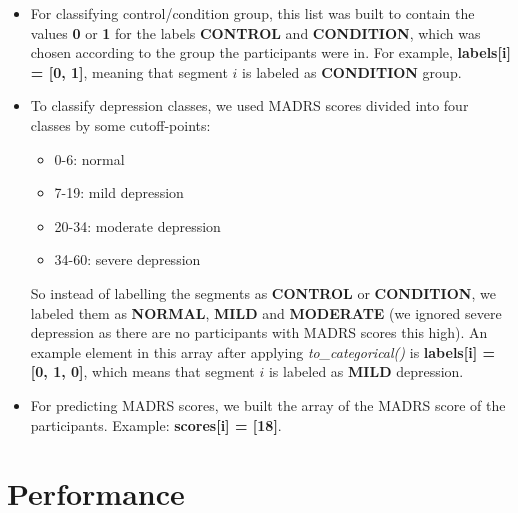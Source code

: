 \begin{itemize}
  \item For classifying control/condition group, this list was built to contain the values \textbf{0} or \textbf{1} for the labels \textbf{CONTROL} and \textbf{CONDITION}, which was chosen according to the group the participants were in. For example, \textbf{labels[i] = [0, 1]}, meaning that segment $i$ is labeled as \textbf{CONDITION} group. 
  
  \item To classify depression classes, we used MADRS scores divided into four classes by some cutoff-points:
  \begin{itemize}
    \item 0-6: normal
    \item 7-19: mild depression
    \item 20-34: moderate depression
    \item 34-60: severe depression
  \end{itemize}
  So instead of labelling the segments as \textbf{CONTROL} or \textbf{CONDITION}, we labeled them as \textbf{NORMAL}, \textbf{MILD} and \textbf{MODERATE} (we ignored severe depression as there are no participants with MADRS scores this high). An example element in this array after applying \textit{to\_categorical()} is \textbf{labels[i] = [0, 1, 0]}, which means that segment $i$ is labeled as \textbf{MILD} depression.
  \item For predicting MADRS scores, we built the array of the MADRS score of the participants. Example: \textbf{scores[i] = [18]}.
\end{itemize}

\section{Performance}

